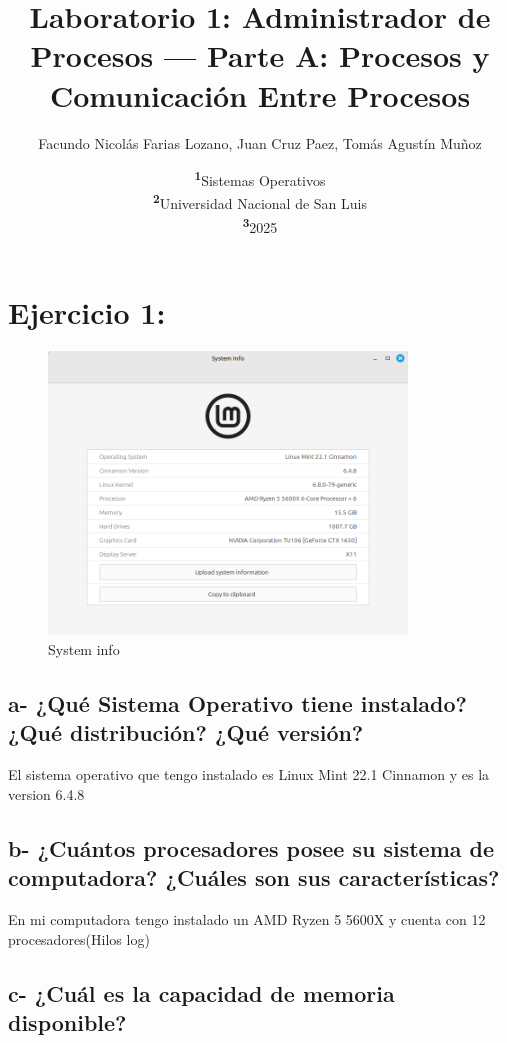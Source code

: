 \documentclass{article}
\title{\textbf{Laboratorio 1: }Administrador de Procesos --- Parte A\@: Procesos y Comunicación Entre Procesos}
\author{
Facundo Nicolás Farias Lozano,
Juan Cruz Paez,
Tomás Agustín Muñoz
}
\date{\footnotesize\textsuperscript{\textbf{1}}Sistemas Operativos\\ \textsuperscript{\textbf{2}}Universidad Nacional de San Luis\\ \textsuperscript{\textbf{3}}2025}
\begin{document}
\maketitle


\section*{Ejercicio 1:}

\begin{figure}[h]
  \centering
  \includegraphics[width=0.85\textwidth]{resources/ej1a.png}
  \caption{System info}
\end{figure}

\subsection*{a- ¿Qué Sistema Operativo tiene instalado? ¿Qué distribución? ¿Qué versión?}
El sistema operativo que tengo instalado es Linux Mint 22.1 Cinnamon y es la version 6.4.8

\subsection*{b- ¿Cuántos procesadores posee su sistema de computadora? ¿Cuáles son sus características?}
En mi computadora tengo instalado un AMD Ryzen 5 5600X y cuenta con 12 procesadores(Hilos log)

\subsection*{c- ¿Cuál es la capacidad de memoria disponible?}
\end{document}
